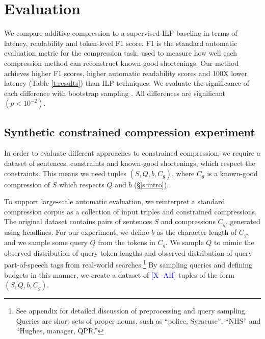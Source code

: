 \documentclass[11pt,a4paper]{article}
\newcommand{\ahcomment}[1]{\textcolor{blue}{[#1 -AH]}}
\begin{document}
\section{Evaluation}\label{s:autoeval}

We compare additive compression to a supervised ILP baseline in terms of latency, readability and token-level F1 score. F1 is the standard automatic evaluation metric for the compression task, used to measure how well each compression method can reconstruct known-good shortenings. Our method achieves higher F1 scores, higher automatic readability scores and 100X lower latency (Table \ref{t:results}) than ILP techniques. We evaluate the significance of each difference with bootstrap sampling \cite{D12-1091}. All differences are significant {\small $(p < 10^{-2})$}. 

\subsection{Synthetic constrained compression experiment}\label{s:constrained}

In order to evaluate different approaches to constrained compression, we require a dataset of sentences, constraints and known-good shortenings, which respect the constraints. This means we need tuples $(S, Q, b, C_g)$, where $C_g$ is a known-good compression of $S$ which respects $Q$ and $b$ (\S\ref{s:intro}).

To support large-scale automatic evaluation, we reinterpret a standard compression corpus \cite{filippova2013overcoming}
as a collection of input triples and constrained compressions. The original dataset contains pairs of sentences $S$ and compressions $C_g$, generated using headlines. For our experiment, we define $b$ as the character length of $C_g$, and we sample some query $Q$ from the tokens in $C_g$. We sample $Q$ to mimic the observed distribution of query token lengths \cite{Jansen2000RealLR} and observed distribution of query part-of-speech tags \cite{Barr2008TheLS} from real-world searches.\footnote{See appendix for detailed discussion of preprocessing and query sampling. Queries are short sets of proper nouns, such as ``police, Syracuse'', ``NHS'' and ``Hughes, manager, QPR.'' } By sampling queries and defining budgets in this manner, we create a dataset of \ahcomment{X} tuples of the form $(S,Q,b,C_g)$.
\end{document}

